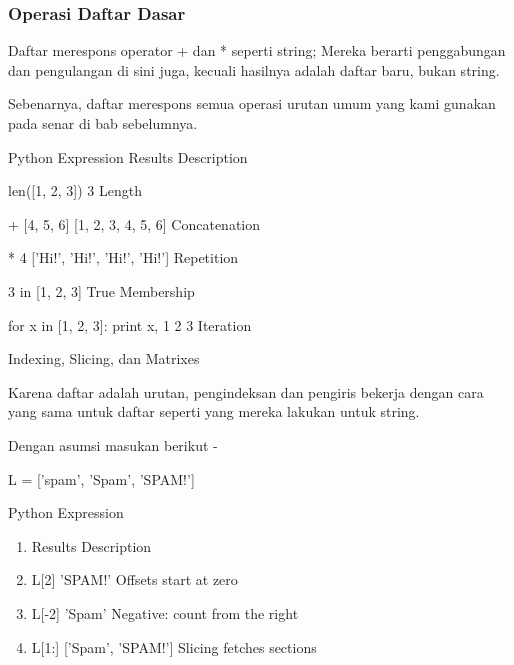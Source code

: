 \subsubsection{Operasi Daftar Dasar}
Daftar merespons operator + dan * seperti string; Mereka berarti penggabungan dan pengulangan di sini juga, kecuali hasilnya adalah daftar baru, bukan string. \par
Sebenarnya, daftar merespons semua operasi urutan umum yang kami gunakan pada senar di bab sebelumnya. \par
Python Expression \hspace*{0.5in} Results  \hspace*{0.5in} Description \par
len([1, 2, 3]) \hspace*{0.5in} 3 \hspace*{0.5in} Length \par
[1, 2, 3] + [4, 5, 6] \hspace*{0.5in} [1, 2, 3, 4, 5, 6] \hspace*{0.5in} Concatenation \par
['Hi!'] * 4 \hspace*{0.5in} ['Hi!', 'Hi!', 'Hi!', 'Hi!'] \hspace*{0.5in} Repetition \par
3 in [1, 2, 3] \hspace*{0.5in} True \hspace*{0.5in} Membership \par
for x in [1, 2, 3]: print x, \hspace*{0.5in} 1 2 3 \hspace*{0.5in} Iteration \par
\vspace{12pt}
Indexing, Slicing, dan Matrixes \par
Karena daftar adalah urutan, pengindeksan dan pengiris bekerja dengan cara yang sama untuk daftar seperti yang mereka lakukan untuk string. \par
Dengan asumsi masukan berikut - \par
L = ['spam', 'Spam', 'SPAM!'] \par
Python Expression 
\begin{enumerate}
\item
\hspace*{0.5in} Results  \hspace*{0.5in} Description 
\item
L[2] \hspace*{0.5in} 'SPAM!' \hspace*{0.5in} Offsets start at zero 
\item
L[-2] \hspace*{0.5in} 'Spam' \hspace*{0.5in} Negative: count from the right
\item
L[1:] \hspace*{0.5in} ['Spam', 'SPAM!'] \hspace*{0.5in} Slicing fetches sections 
\end{enumerate}
